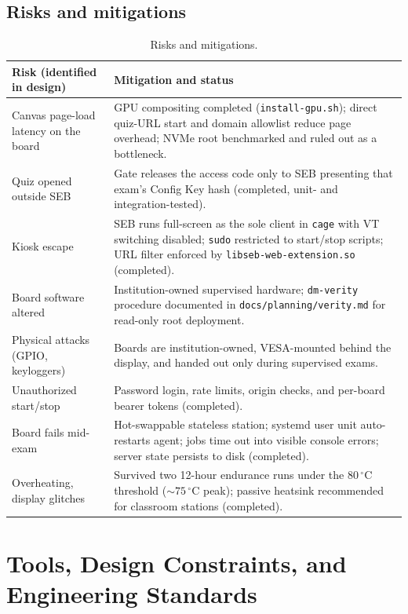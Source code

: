 \documentclass[11pt]{article}
\begin{document}
\subsection{Risks and mitigations}
\begin{table}[H]
\centering
\footnotesize
\begin{tabularx}{\textwidth}{@{}p{}X@{}}
\toprule
\textbf{Risk (identified in design)} & \textbf{Mitigation and status} \\
\midrule
Canvas page-load latency on the board & GPU compositing completed (\texttt{install-gpu.sh}); direct quiz-URL start and domain allowlist reduce page overhead; NVMe root benchmarked and ruled out as a bottleneck. \\
Quiz opened outside SEB & Gate releases the access code only to SEB presenting that exam's Config Key hash (completed, unit- and integration-tested). \\
Kiosk escape & SEB runs full-screen as the sole client in \texttt{cage} with VT switching disabled; \texttt{sudo} restricted to start/stop scripts; URL filter enforced by \texttt{libseb-web-extension.so} (completed). \\
Board software altered & Institution-owned supervised hardware; \texttt{dm-verity} procedure documented in \texttt{docs/planning/verity.md} for read-only root deployment. \\
Physical attacks (GPIO, keyloggers) & Boards are institution-owned, VESA-mounted behind the display, and handed out only during supervised exams. \\
Unauthorized start/stop & Password login, rate limits, origin checks, and per-board bearer tokens (completed). \\
Board fails mid-exam & Hot-swappable stateless station; systemd user unit auto-restarts agent; jobs time out into visible console errors; server state persists to disk (completed). \\
Overheating, display glitches & Survived two 12-hour endurance runs under the $80\,^\circ\text{C}$ threshold ($\sim 75\,^\circ\text{C}$ peak); passive heatsink recommended for classroom stations (completed). \\
\bottomrule
\end{tabularx}
\caption{Risks and mitigations.}
\end{table}

\section{Tools, Design Constraints, and Engineering Standards}
\end{document}
